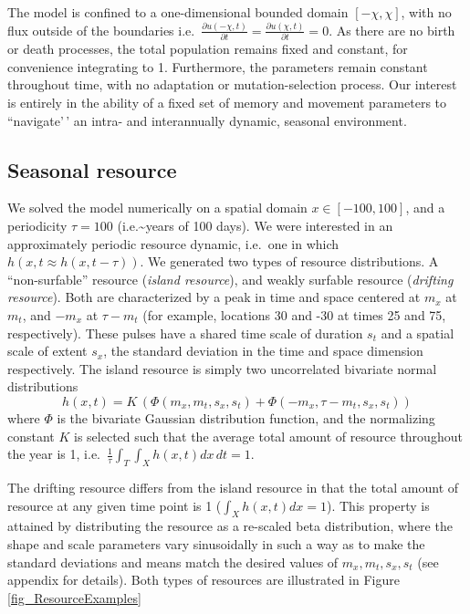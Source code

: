 \documentclass[12pt]{article}
\begin{document}
The model is confined to a one-dimensional bounded domain $[-\chi,\chi]$, with no flux outside of the boundaries i.e.~${\frac{\partial u(-\chi,t)}{\partial t}} = {\frac{\partial u(\chi,t)}{\partial t}} =0$. As there are no birth or death processes, the total population remains fixed and constant, for convenience integrating to 1. Furthermore, the parameters remain constant throughout time, with no adaptation or mutation-selection process. Our interest is entirely in the ability of a fixed set of memory and movement parameters to ``navigate'\,' an intra- and interannually dynamic, seasonal environment.

\subsection{Seasonal resource}

We solved the model numerically on a spatial domain $x \in [-100,100]$, and a periodicity $\tau = 100$ (i.e.\textasciitilde years of 100 days). We were interested in an approximately periodic resource dynamic, i.e.~one in which $h(x,t \approx h(x, t-\tau))$. We generated two types of resource distributions. A ``non-surfable'' resource (\emph{island resource}), and weakly surfable resource (\emph{drifting resource}). Both are characterized by a peak in time and space centered at $m_x$ at $m_t$, and $-m_x$ at $\tau - m_t$ (for example, locations 30 and -30 at times 25 and 75, respectively). These pulses have a shared time scale of duration $s_t$ and a spatial scale of extent $s_x$, the standard deviation in the time and space dimension respectively. The island resource is simply two uncorrelated bivariate normal
distributions 
$$h(x,t) = K\,(\Phi(m_x, m_t, s_x, s_t) + \Phi(-m_x, \tau - m_t, s_x, s_t))$$ 
\noindent where $\Phi$ is the bivariate Gaussian distribution function, and the normalizing constant $K$ is selected such that the average total amount of resource throughout the year is 1, i.e.~$\frac{1}{\tau} \int_T\int_X h(x,t) dx\,dt = 1$.

The drifting resource differs from the island resource in that the total amount of resource at any given time point is 1 ($\int_X h(x,t) dx = 1$). This property is attained by distributing the resource as a re-scaled beta distribution, where the shape and scale parameters vary sinusoidally in such a way as to make the standard deviations and means match the desired values of $m_x, m_t, s_x, s_t$ (see appendix for details). Both types of resources are illustrated in Figure \ref{fig_ResourceExamples}
\end{document}

